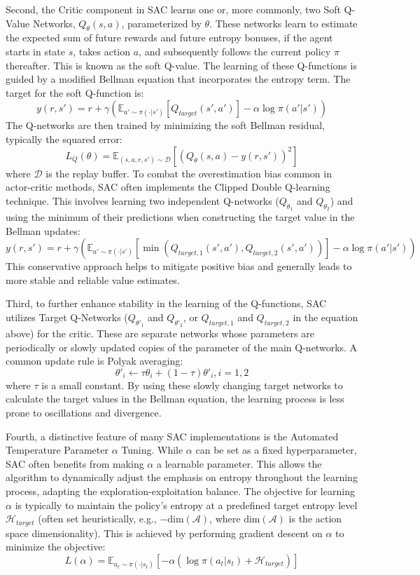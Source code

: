 Second, the Critic component in \gls{SAC} learns one or, more commonly, two Soft Q-Value Networks, \(Q_\theta(s, a)\), parameterized by \(\theta\). These networks learn to estimate the expected sum of future rewards and future entropy bonuses, if the agent starts in state \(s\), takes action \(a\), and subsequently follows the current policy \(\pi\) thereafter. This is known as the soft Q-value. The learning of these Q-functions is guided by a modified Bellman equation that incorporates the entropy term. The target for the soft Q-function is:
\[y(r, s') = r + \gamma(\mathbb{E}_{a' \sim \pi(\cdot|s')} [Q_{target}(s', a')] - \alpha \log \pi(a'|s'))\] 
The Q-networks are then trained by minimizing the soft Bellman residual, typically the squared error: 
\[L_Q(\theta) = \mathbb{E}_{(s,a,r,s') \sim \mathcal{D}} [(Q_\theta(s,a) - y(r,s'))^2]\]
where \(\mathcal{D}\) is the replay buffer. To combat the overestimation bias common in actor-critic methods, \gls{SAC} often implements the Clipped Double Q-learning technique. This involves learning two independent Q-networks (\(Q_{\theta_1}\) and \(Q_{\theta_2}\)) and using the minimum of their predictions when constructing the target value in the Bellman updates:
\[y(r, s') = r + \gamma(\mathbb{E}_{a' \sim \pi(\cdot|s')} [\min(Q_{target,1}(s', a'), Q_{target,2}(s', a'))] - \alpha \log \pi(a'|s'))\]
This conservative approach helps to mitigate positive bias and generally leads to more stable and reliable value estimates.

Third, to further enhance stability in the learning of the Q-functions, \gls{SAC} utilizes Target Q-Networks (\(Q_{\theta'_1}\) and \(Q_{\theta'_2}\), or \(Q_{target,1}\) and \(Q_{target,2}\) in the equation above) for the critic. These are separate networks whose parameters are periodically or slowly updated copies of the parameter of the main Q-networks. A common update rule is Polyak averaging: 
\[\theta'_i \leftarrow \tau\theta_i + (1-\tau)\theta'_i, i=1,2\] 
where \(\tau\) is a small constant. By using these slowly changing target networks to calculate the target values in the Bellman equation, the learning process is less prone to oscillations and divergence.

Fourth, a distinctive feature of many \gls{SAC} implementations is the Automated Temperature Parameter \(\alpha\) Tuning. While \(\alpha\) can be set as a fixed hyperparameter, \gls{SAC} often benefits from making \(\alpha\) a learnable parameter. This allows the algorithm to dynamically adjust the emphasis on entropy throughout the learning process, adapting the exploration-exploitation balance. The objective for learning \(\alpha\) is typically to maintain the policy's entropy at a predefined target entropy level \(\mathcal{H}_{target}\) (often set heuristically, e.g., \(-\text{dim}(\mathcal{A})\), where \(\text{dim}(\mathcal{A})\) is the action space dimensionality). This is achieved by performing gradient descent on \(\alpha\) to minimize the objective:
\[L(\alpha) = \mathbb{E}_{a_t \sim \pi(\cdot|s_t)} [-\alpha (\log \pi(a_t|s_t) + \mathcal{H}_{target})]\]

